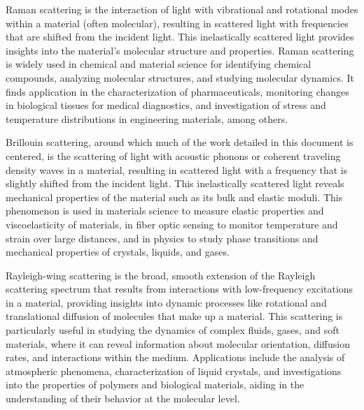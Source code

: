 Raman scattering is the interaction of light with vibrational and rotational modes within a material (often molecular), resulting in scattered light with frequencies that are shifted from the incident light. This inelastically scattered light provides insights into the material's molecular structure and properties. Raman scattering is widely used in chemical and material science for identifying chemical compounds, analyzing molecular structures, and studying molecular dynamics. It finds application in the characterization of pharmaceuticals\cite{}, monitoring changes in biological tissues for medical diagnostics\cite{}, and investigation of stress and temperature distributions in engineering materials\cite{}, among others\cite{}.

Brillouin scattering, around which much of the work detailed in this document is centered, is the scattering of light with acoustic phonons or coherent traveling density waves in a material, resulting in scattered light with a frequency that is slightly shifted from the incident light. This inelastically scattered light reveals mechanical properties of the material such as its bulk and elastic moduli. This phenomenon is used in materials science to measure elastic properties and viscoelasticity of materials\cite{}, in fiber optic sensing to monitor temperature and strain over large distances\cite{}, and in physics to study phase transitions and mechanical properties of crystals, liquids, and gases\cite{}.

Rayleigh-wing scattering is the broad, smooth extension of the Rayleigh scattering spectrum that results from interactions with low-frequency excitations in a material, providing insights into dynamic processes like rotational and translational diffusion of molecules that make up a material. This scattering is particularly useful in studying the dynamics of complex fluids, gases, and soft materials, where it can reveal information about molecular orientation, diffusion rates, and interactions within the medium. Applications include the analysis of atmospheric phenomena\cite{}, characterization of liquid crystals\cite{}, and investigations into the properties of polymers and biological materials\cite{}, aiding in the understanding of their behavior at the molecular level.

